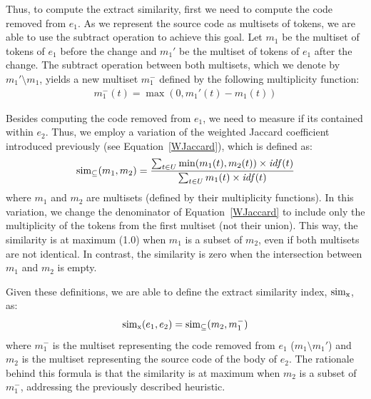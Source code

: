 
Thus, to compute the extract similarity, first we need to compute the code removed from $e_1$. As we represent the source code as multisets of tokens, we are able to use the subtract operation to achieve this goal.
Let $m_1$ be the multiset of tokens of $e_1$ before the change and $m_1'$ be the multiset of tokens of $e_1$ after the change.
The subtract operation between both multisets, which we denote by $m_1' \setminus m_1$, yields a new multiset $m_1^-$ defined by the following multiplicity function:
\begin{align}
m_1^-(t) = \max(0, m_1'(t) - m_1(t))
\end{align}

Besides computing the code removed from $e_1$, we need to measure if its contained within $e_2$. Thus, we employ a variation of the weighted Jaccard coefficient introduced previously (see Equation~\ref{WJaccard}), which is defined as:
\begin{align}
\operatorname{sim_{\subseteq}}(m_1, m_2) = \frac{\sum_{t \in U} \min(m_1(t), m_2(t)) \times \mathit{idf}(t)}
                        {\sum_{t \in U} m_1(t) \times \mathit{idf}(t)}
\end{align}
where $m_1$ and $m_2$ are multisets (defined by their multiplicity functions).
In this variation, we change the denominator of Equation~\ref{WJaccard} to include only the multiplicity of the tokens from the first multiset (not their union).
This way, the similarity is at maximum (1.0) when $m_1$ is a subset of $m_2$, even if both multisets are not identical. In contrast, the similarity is zero when the intersection between $m_1$ and $m_2$ is empty.


Given these definitions, we are able to define the extract similarity index, $\operatorname{sim_{x}}$, as:
\begin{align}
\operatorname{sim_{x}}(e_1, e_2) = \operatorname{sim_{\subseteq}}(m_2, m_1^-)
\end{align}
where $m_1^-$ is the multiset representing the code removed from $e_1$ ($m_1 \setminus m_1'$) and $m_2$ is the multiset representing the source code of the body of $e_2$.
The rationale behind this formula is that the similarity is at maximum
when $m_2$ is a subset of $m_1^-$, addressing the previously described heuristic.



